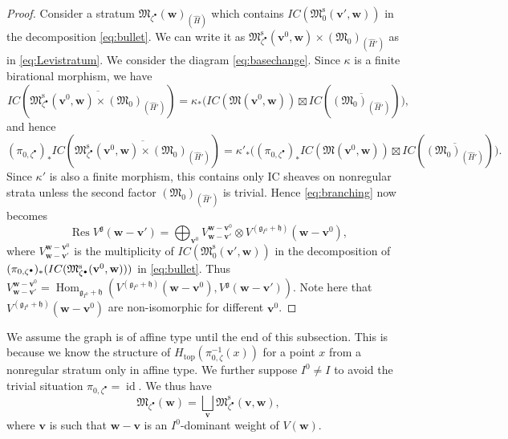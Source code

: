 \documentclass[pdftex]{sigma}
\theoremstyle{definition}
\numberwithin{equation}{section}
\newcommand{\g}{{\mathfrak g}}
\newcommand{\Hom}{\operatorname{Hom}}
\newcommand{\id}{\operatorname{id}}
\newcommand{\M}{{\mathfrak M}} %
\newcommand{\Mreg}{\M^{\operatorname{s}}}
\newcommand{\bv}{{\mathbf v}} %
\newcommand{\bw}{{\mathbf w}} %
\newcommand{\topdeg}{{\operatorname{top}}} %
\begin{document}
\begin{proof}
Consider a stratum $\M_{\zeta^\bullet}(\bw)_{(\widehat H)}$ which
contains $IC(\Mreg_0(\bv',\bw))$ in the decomposition
\eqref{eq:bullet}. We can write it as
$\Mreg_{\zeta^\bullet}(\bv^0,\bw)\times (\M_0)_{(\widehat H')}$ as in
\eqref{eq:Levistratum}. We consider the diagram
\eqref{eq:basechange}. Since $\kappa$ is a f\/inite birational morphism,
we have
\begin{equation*}
  IC(\overline{\Mreg_{\zeta^\bullet}(\bv^0,\bw)
     \times (\M_0)_{(\widehat H')}})
   = \kappa_*\big(
     IC(\M(\bv^0,\bw))\boxtimes IC(\overline{(\M_0)_{(\widehat H')}})
   \big),
\end{equation*}
and hence
\begin{equation*}\label{eq:nonregular}
  (\pi_{0,\zeta^\bullet})_* IC(\overline{\Mreg_{\zeta^\bullet}(\bv^0,\bw)
     \times (\M_0)_{(\widehat H')}}) = \kappa'_*\big(
   (\pi_{0,\zeta^\bullet})_*IC(\M(\bv^0,\bw))\boxtimes
   IC(\overline{(\M_0)_{(\widehat H')}})\big).
\end{equation*}
Since $\kappa'$ is also a f\/inite morphism, this contains only IC
sheaves on nonregular strata unless the second factor
$(\M_0)_{(\widehat H')}$ is trivial.
%
Hence \eqref{eq:branching} now becomes
\begin{equation}\label{eq:restriction}
   \operatorname{Res} V^{\g}(\bw - \bv')
   = \bigoplus_{\bv^0} V_{\bw-\bv'}^{\bw-\bv^0}
   \otimes V^{(\g_{I^0}+\mathfrak h)}(\bw - \bv^0),
\end{equation}
where $V_{\bw-\bv'}^{\bw-\bv^0}$ is the multiplicity of
$IC(\Mreg_0(\bv',\bw))$ in the decomposition of\linebreak[2]
$(\pi_{0,\zeta^\bullet})_*\linebreak[2](IC(\Mreg_{\zeta^\bullet}(\bv^0,
\linebreak[2]\bw)))$ in
\eqref{eq:bullet}. Thus
$V_{\bw-\bv'}^{\bw-\bv^0} =
\Hom_{\g_{I^0}+\mathfrak h}
(V^{(\g_{I^0}+\mathfrak h)}(\bw - \bv^0), V^\g(\bw-\bv'))$.
%
Note here that $V^{(\g_{I^0}+\mathfrak h)}(\bw - \bv^0)$ are
non-isomorphic for dif\/ferent $\bv^0$.
\end{proof}

We assume the graph is of af\/f\/ine type until the end of this
subsection.
%
This is because we know the structure of $H_{\topdeg}(\pi_{0,\zeta}^{-1}(x))$
for a point $x$ from a nonregular stratum only in af\/f\/ine type.
%
We further suppose $I^0\neq I$ to avoid the trivial
situation $\pi_{0,\zeta^\bullet} = \id$. We thus have
\begin{equation}\label{eq:zetastratum}
  \M_{\zeta^\bullet}(\bw) = \bigsqcup_{\bv}
  \Mreg_{\zeta^\bullet}(\bv,\bw),
\end{equation}
where $\bv$ is such that $\bw - \bv$ is an $I^0$-dominant weight of
$V(\bw)$.
\end{document}
